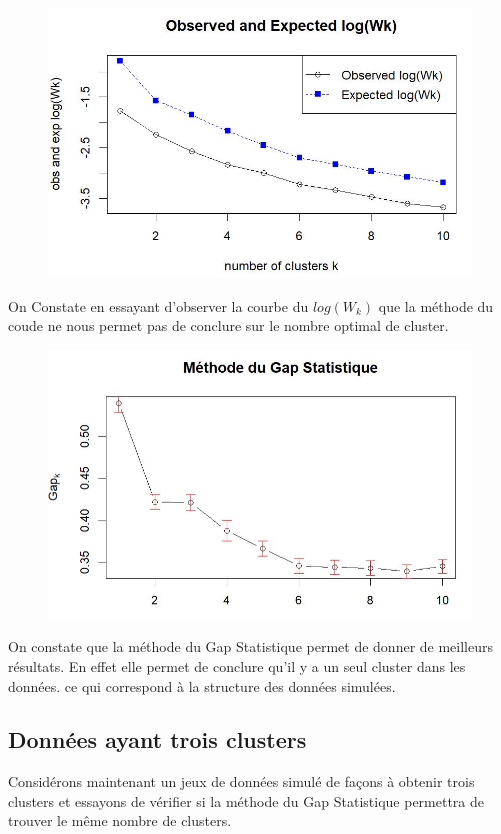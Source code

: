 \begin{figure}[H]
    \centering
    \includegraphics[width=0.5\linewidth]{images/Exp.JPG}
    \caption{}
    \label{fig:enter-label}
\end{figure}

On Constate en essayant d'observer la courbe du \(log(W_k)\) que la méthode du coude ne nous permet pas de conclure sur le nombre optimal de cluster. 

\begin{figure}[H]
    \centering
    \includegraphics[width=0.5\linewidth]{images/Gaps.JPG}
    \caption{}
    \label{fig:enter-label}
\end{figure}


On constate que la méthode du Gap Statistique permet de donner de meilleurs résultats. En effet elle permet de conclure qu'il y a un seul cluster dans les données. ce qui correspond à la structure des données simulées. 

\newpage
\subsection{Données ayant trois clusters}
 Considérons maintenant un jeux de données simulé de façons à obtenir trois clusters et essayons de vérifier si la méthode du Gap Statistique permettra de trouver le même nombre de clusters.


